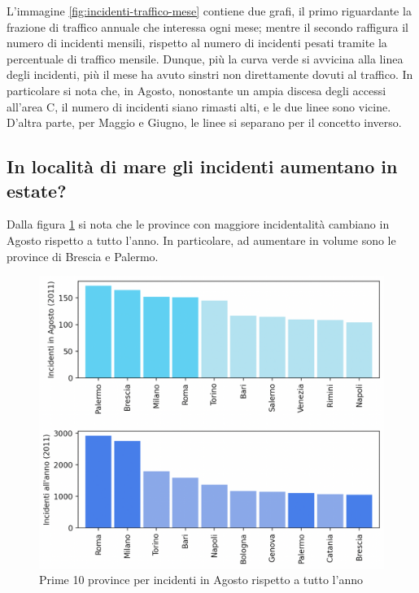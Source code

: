 \documentclass[a4paper]{report}
\begin{document}
L'immagine \ref{fig:incidenti-traffico-mese} contiene due grafi, 
il primo riguardante la frazione di traffico annuale che interessa ogni mese; 
mentre il secondo raffigura il numero di incidenti mensili, rispetto al numero di incidenti pesati 
tramite la percentuale di traffico mensile.
Dunque, più la curva verde si avvicina alla linea degli incidenti, più il mese ha avuto sinstri 
non direttamente dovuti al traffico.
In particolare si nota che, in Agosto, nonostante un ampia discesa degli accessi all'area C, 
il numero di incidenti siano rimasti alti, e le due linee sono vicine.
D'altra parte, per Maggio e Giugno, le linee si separano per il concetto inverso.

\subsection{In località di mare gli incidenti aumentano in estate?}

Dalla figura \ref{fig:mesi-estivi} si nota che le province con maggiore incidentalità 
cambiano in Agosto rispetto a tutto l'anno. In particolare, ad aumentare in volume sono le 
province di Brescia e Palermo.

\begin{figure}
    \includegraphics[width=\linewidth]{../src/incidenti/incidenti_senza_coords/mese_incidenti/mesi_estivi.png}
    \caption{Prime 10 province per incidenti in Agosto rispetto a tutto l'anno}
    \label{fig:mesi-estivi}
\end{figure}
\end{document}

